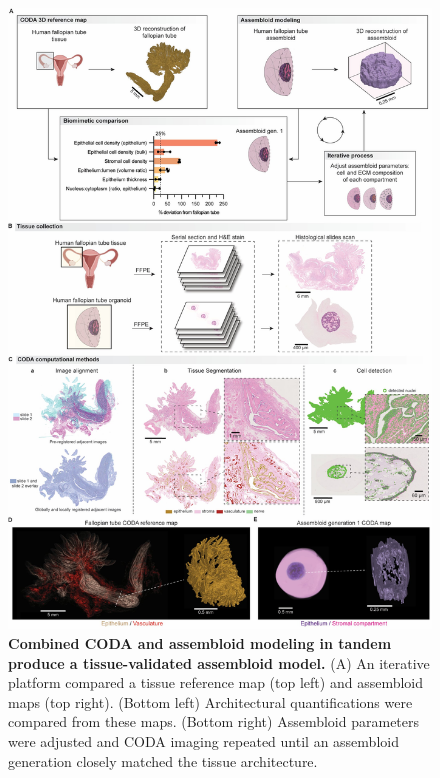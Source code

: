 \begin{refsection}
    \begin{figure}[p]
        \begin{center}
            \includegraphics[width=1\textwidth,height=0.85\textheight,keepaspectratio,clip,page=1]{figures/chapter4/fig_5.jpg}
            \captionsetup{font=small}
            \caption{\textbf{Combined CODA and assembloid modeling in tandem produce a tissue-validated assembloid model.} (A) An iterative platform compared a tissue reference map (top left) and assembloid maps (top right). (Bottom left) Architectural quantifications were compared from these maps. (Bottom right) Assembloid parameters were adjusted and CODA imaging repeated until an assembloid generation closely matched the tissue architecture. }
            \label{chapter4_fig5}
        \end{center}
    \end{figure}
    

\end{refsection}
